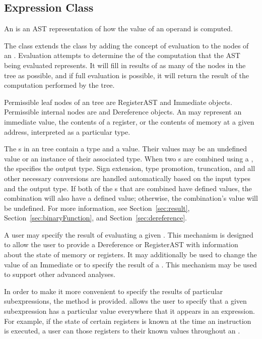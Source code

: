 \subsection{Expression Class}
\label{sec:expression}

An  is an AST representation of how the value of an operand is
computed.

The  class extends the  class by adding the concept of
evaluation to the nodes of an . Evaluation attempts to determine
the  of the
computation that the AST being evaluated represents. It will fill in results of
as many of the nodes in the tree as possible, and if full evaluation is
possible, it will return the result of the computation performed by the tree.

Permissible leaf nodes of an  tree are RegisterAST and Immediate
objects. Permissible internal nodes are  and Dereference objects.
An  may represent an immediate value, the contents of a register, or
the contents of memory at a given address, interpreted as a particular type.

The s in an  tree contain a type and a value. Their values may
be an undefined value or an instance of their associated type. When two s
are combined using a , the  specifies the output
type. Sign extension, type promotion, truncation, and all other necessary
conversions are handled automatically based on the input types and the output
type. If both of the s that are combined have defined values, the
combination will also have a defined value; otherwise, the combination's value
will be undefined. For more information, see
Section~\ref{sec:result}, Section~\ref{sec:binaryFunction}, and
Section~\ref{sec:dereference}.

A user may specify the result of evaluating a given . This mechanism
is designed to allow the user to provide a Dereference or RegisterAST with
information about the state of memory or registers. It may additionally be used
to change the value of an Immediate or to specify the result of a
. This mechanism may be used to support other advanced analyses.

In order to make it more convenient to specify the results of particular
subexpressions, the  method is provided.  allows the user
to specify that a given subexpression has a particular value everywhere that it
appears in an expression. For example, if the state of certain registers is
known at the time an instruction is executed, a user can  those
registers to their known values throughout an .

